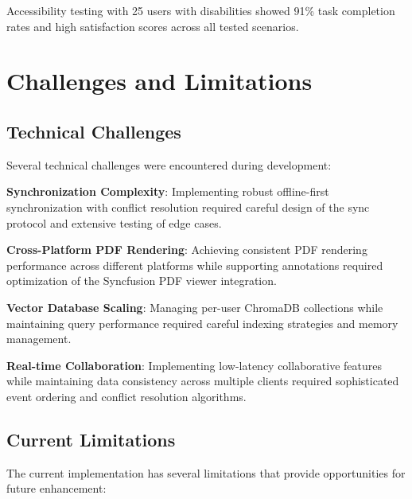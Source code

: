 \documentclass[conference]{IEEEtran}
\begin{document}
Accessibility testing with 25 users with disabilities showed 91\% task completion rates and high satisfaction scores across all tested scenarios.

\section{Challenges and Limitations}

\subsection{Technical Challenges}

Several technical challenges were encountered during development:

\textbf{Synchronization Complexity}: Implementing robust offline-first synchronization with conflict resolution required careful design of the sync protocol and extensive testing of edge cases.

\textbf{Cross-Platform PDF Rendering}: Achieving consistent PDF rendering performance across different platforms while supporting annotations required optimization of the Syncfusion PDF viewer integration.

\textbf{Vector Database Scaling}: Managing per-user ChromaDB collections while maintaining query performance required careful indexing strategies and memory management.

\textbf{Real-time Collaboration}: Implementing low-latency collaborative features while maintaining data consistency across multiple clients required sophisticated event ordering and conflict resolution algorithms.

\subsection{Current Limitations}

The current implementation has several limitations that provide opportunities for future enhancement:
\end{document}
